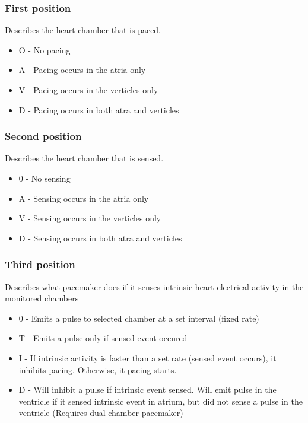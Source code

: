 \documentclass[xcolor=dvipsnames]{beamer}
\begin{document}
  \begin{frame}
    \frametitle{First position}
Describes the heart chamber that is paced.
\begin{itemize}
  \item O - No pacing
      \item A - Pacing occurs in the atria only
      \item V - Pacing occurs in the verticles only
      \item D - Pacing occurs in both atra and verticles
\end{itemize}
  \end{frame}

  \begin{frame}
    \frametitle{Second position}
Describes the heart chamber that is sensed.
\begin{itemize}
  \item 0 - No sensing
  \item A - Sensing occurs in the atria only
  \item V - Sensing occurs in the verticles only
  \item D - Sensing occurs in both atra and verticles
\end{itemize}

  \end{frame}

  \begin{frame}
    \frametitle{Third position}
    Describes what pacemaker does if it senses intrinsic heart electrical activity in the monitored chambers
  \begin{itemize}
    \item 0 - Emits a pulse to selected chamber at a set interval (fixed rate)
    \item T - Emits a pulse only if sensed event occured
    \item I - If intrinsic activity is faster than a set rate (sensed event occurs), it inhibits pacing. Otherwise, it pacing starts.
    \item D - Will inhibit a pulse if intrinsic event sensed. Will emit pulse in the ventricle if it sensed intrinsic event in atrium, but did not sense a pulse in the ventricle (Requires dual chamber pacemaker)
  \end{itemize}

  \end{frame}
\end{document}
